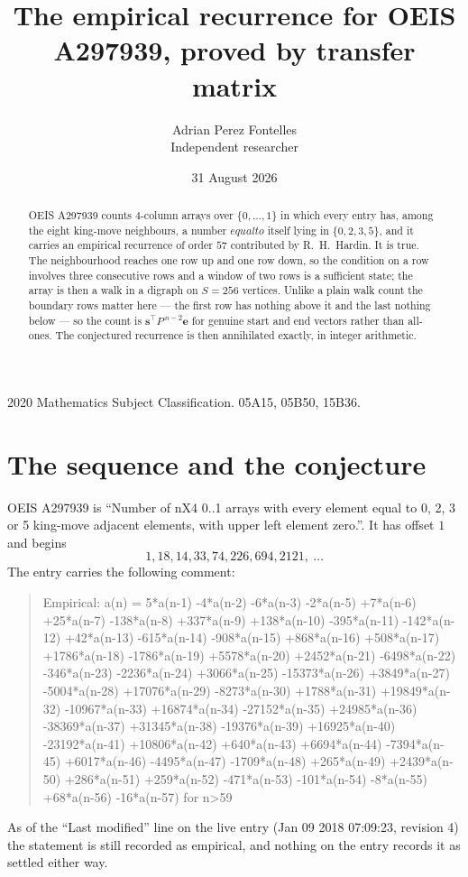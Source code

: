 \documentclass[11pt,a4paper]{article}
\title{The empirical recurrence for OEIS A297939, proved by transfer matrix}
\author{Adrian Perez Fontelles\\ \small Independent researcher}
\date{31 August 2026}
\theoremstyle{plain}
\theoremstyle{definition}
\begin{document}
\maketitle

\begin{abstract}
OEIS A297939 counts $4$-column arrays over $\{0,\dots,1\}$ in which every entry has,
among the eight king-move neighbours, a number $equal to$ itself lying in $\{0,2,3,5\}$, and it carries an empirical
recurrence of order $57$ contributed by R.~H.~Hardin. It is true. The neighbourhood
reaches one row up and one row down, so the condition on a row involves three consecutive
rows and a window of two rows is a sufficient state; the array is then a walk in a digraph
on $S=256$ vertices. Unlike a plain walk count the boundary rows matter here --- the first
row has nothing above it and the last nothing below --- so the count is
$\mathbf{s}^{\!\top}P^{\,n-2}\mathbf{e}$ for genuine start and end vectors rather than
all-ones. The conjectured recurrence is then annihilated exactly, in integer arithmetic.
\end{abstract}

\noindent\small 2020 Mathematics Subject Classification. 05A15, 05B50, 15B36.\normalsize

\section{The sequence and the conjecture}

OEIS A297939 is ``Number of nX4 0..1 arrays with every element equal to 0, 2, 3 or 5 king-move adjacent elements, with upper left element zero.''. It has offset
$1$ and begins
\[
1, 18, 14, 33, 74, 226, 694, 2121,\ \dots
\]
The entry carries the following comment:
\begin{quote}\small
Empirical: a(n) = 5*a(n-1) -4*a(n-2) -6*a(n-3) -2*a(n-5) +7*a(n-6) +25*a(n-7) -138*a(n-8) +337*a(n-9) +138*a(n-10) -395*a(n-11) -142*a(n-12) +42*a(n-13) -615*a(n-14) -908*a(n-15) +868*a(n-16) +508*a(n-17) +1786*a(n-18) -1786*a(n-19) +5578*a(n-20) +2452*a(n-21) -6498*a(n-22) -346*a(n-23) -2236*a(n-24) +3066*a(n-25) -15373*a(n-26) +3849*a(n-27) -5004*a(n-28) +17076*a(n-29) -8273*a(n-30) +1788*a(n-31) +19849*a(n-32) -10967*a(n-33) +16874*a(n-34) -27152*a(n-35) +24985*a(n-36) -38369*a(n-37) +31345*a(n-38) -19376*a(n-39) +16925*a(n-40) -23192*a(n-41) +10806*a(n-42) +640*a(n-43) +6694*a(n-44) -7394*a(n-45) +6017*a(n-46) -4495*a(n-47) -1709*a(n-48) +265*a(n-49) +2439*a(n-50) +286*a(n-51) +259*a(n-52) -471*a(n-53) -101*a(n-54) -8*a(n-55) +68*a(n-56) -16*a(n-57) for n>59
\end{quote}
As of the ``Last modified'' line on the live entry (Jan 09 2018 07:09:23, revision
4) the statement is still recorded as empirical, and nothing on the entry
records it as settled either way.
\end{document}
